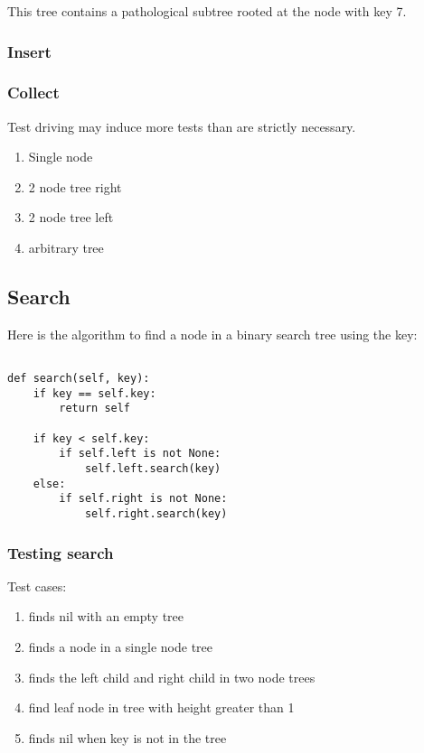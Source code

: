 \documentclass{article}
\begin{document}
This tree contains a pathological subtree rooted at the node with key 7.

\subsubsection{Insert}



\subsubsection{Collect}

Test driving may induce more tests than are strictly necessary.

\begin{enumerate}
\item Single node
\item 2 node tree right
\item 2 node tree left
\item arbitrary tree
\end{enumerate}

\subsection{Search}

Here is the algorithm to find a node in a binary search tree using the key:

\begin{lstlisting}[frame=single]

def search(self, key):
    if key == self.key:
        return self

    if key < self.key:
        if self.left is not None:
            self.left.search(key)
    else:
        if self.right is not None:
            self.right.search(key)
\end{lstlisting}

\subsubsection{Testing search}

Test cases:
\begin{enumerate}
\item finds nil with an empty tree
\item finds a node in a single node tree
\item finds the left child and right child in two node trees
\item find leaf node in tree with height greater than 1
\item finds nil when key is not in the tree
\end{enumerate}
\end{document}
